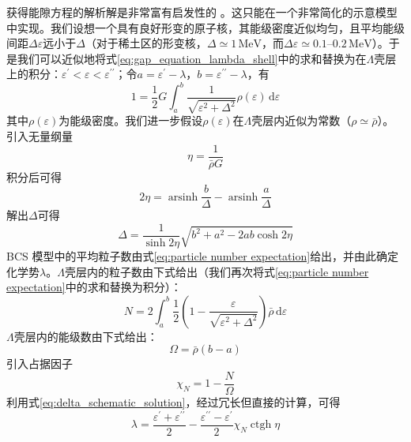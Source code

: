 获得能隙方程的解析解是非常富有启发性的 \cite{Be59}。这只能在一个非常简化的示意模型中实现。我们设想一个具有良好形变的原子核，其能级密度近似均匀，且平均能级间距$\Delta\varepsilon$远小于$\Delta$（对于稀土区的形变核，$\Delta\simeq1\,\text{MeV}$，而$\Delta\varepsilon\simeq0.1\text{--}0.2\,\text{MeV}$）。于是我们可以近似地将式\ref{eq:gap_equation_lambda_shell}中的求和替换为在$\Lambda$壳层上的积分：$\varepsilon^{\prime}<\varepsilon<\varepsilon^{\prime\prime}$；令$a=\varepsilon^{\prime}-\lambda$，$b=\varepsilon^{\prime\prime}-\lambda$，有
\begin{equation}
1=\frac{1}{2}G\int^{b}_{a}\frac{1}{\sqrt{\varepsilon^{2}+\Delta^{2}}}\rho(\varepsilon)\,\mathrm{d}\varepsilon\label{eq:schematic_gap_integral}
\end{equation}
其中$\rho(\varepsilon)$为能级密度。我们进一步假设$\rho(\varepsilon)$在$\Lambda$壳层内近似为常数（$\rho\simeq\bar{\rho}$）。引入无量纲量
\begin{equation}
\eta=\frac{1}{\bar{\rho}G}\label{eq:eta_definition}
\end{equation}
积分后可得
\begin{equation}
2\eta=\operatorname{arsinh}\frac{b}{\Delta}-\operatorname{arsinh}\frac{a}{\Delta}\label{eq:arsinh_relation}
\end{equation}
解出$\Delta$可得
\begin{equation}
\Delta=\frac{1}{\sinh2\eta}\sqrt{b^{2}+a^{2}-2ab\cosh2\eta}\label{eq:delta_schematic_solution}
\end{equation}
BCS 模型中的平均粒子数由式\ref{eq:particle number expectation}给出，并由此确定化学势$\lambda$。$\Lambda$壳层内的粒子数由下式给出（我们再次将式\ref{eq:particle number expectation}中的求和替换为积分）：
\begin{equation}
N=2\int^{b}_{a}\frac{1}{2}\left(1-\frac{\varepsilon}{\sqrt{\varepsilon^{2}+\Delta^{2}}}\right)\bar{\rho}\,\mathrm{d}\varepsilon\label{eq:particle_number_schematic}
\end{equation}
$\Lambda$壳层内的能级数由下式给出：
\begin{equation}
\Omega=\bar{\rho}(b-a)\label{eq:omega_levels}
\end{equation}
引入占据因子
\begin{equation}
\chi_{N}=1-\frac{N}{\Omega}\label{eq:chi_n_definition}
\end{equation}
利用式\ref{eq:delta_schematic_solution}，经过冗长但直接的计算，可得
\begin{equation}
\lambda=\frac{\varepsilon^{\prime}+\varepsilon^{\prime\prime}}{2}-\frac{\varepsilon^{\prime\prime}-\varepsilon^{\prime}}{2}\chi_{N}\operatorname{ctgh}\eta\label{eq:lambda_schematic}
\end{equation}
